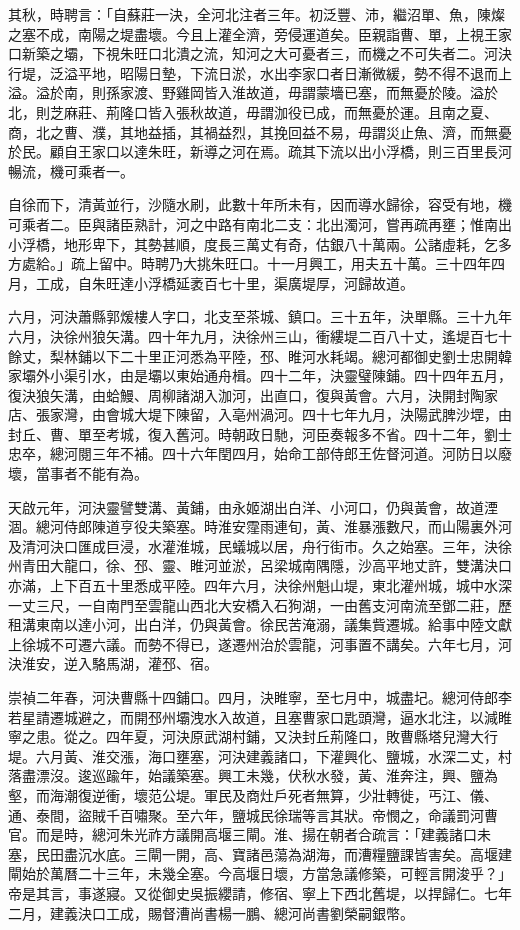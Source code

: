 其秋，時聘言：「自蘇莊一決，全河北注者三年。初泛豐、沛，繼沼單、魚，陳燦之塞不成，南陽之堤盡壞。今且上灌全濟，旁侵運道矣。臣親詣曹、單，上視王家口新築之壩，下視朱旺口北潰之流，知河之大可憂者三，而機之不可失者二。河決行堤，泛溢平地，昭陽日墊，下流日淤，水出李家口者日漸微緩，勢不得不退而上溢。溢於南，則孫家渡、野雞岡皆入淮故道，毋謂蒙墻已塞，而無憂於陵。溢於北，則芝麻莊、荊隆口皆入張秋故道，毋謂泇役已成，而無憂於運。且南之夏、商，北之曹、濮，其地益插，其禍益烈，其挽回益不易，毋謂災止魚、濟，而無憂於民。顧自王家口以達朱旺，新導之河在焉。疏其下流以出小浮橋，則三百里長河暢流，機可乘者一。

自徐而下，清黃並行，沙隨水刷，此數十年所未有，因而導水歸徐，容受有地，機可乘者二。臣與諸臣熟計，河之中路有南北二支：北出濁河，嘗再疏再壅；惟南出小浮橋，地形卑下，其勢甚順，度長三萬丈有奇，估銀八十萬兩。公諸虛耗，乞多方處給。」疏上留中。時聘乃大挑朱旺口。十一月興工，用夫五十萬。三十四年四月，工成，自朱旺達小浮橋延袤百七十里，渠廣堤厚，河歸故道。

六月，河決蕭縣郭煖樓人字口，北支至茶城、鎮口。三十五年，決單縣。三十九年六月，決徐州狼矢溝。四十年九月，決徐州三山，衝縷堤二百八十丈，遙堤百七十餘丈，梨林鋪以下二十里正河悉為平陸，邳、睢河水耗竭。總河都御史劉士忠開韓家壩外小渠引水，由是壩以東始通舟楫。四十二年，決靈璧陳鋪。四十四年五月，復決狼矢溝，由蛤鰻、周柳諸湖入泇河，出直口，復與黃會。六月，決開封陶家店、張家灣，由會城大堤下陳留，入亳州渦河。四十七年九月，決陽武脾沙堽，由封丘、曹、單至考城，復入舊河。時朝政日馳，河臣奏報多不省。四十二年，劉士忠卒，總河閱三年不補。四十六年閏四月，始命工部侍郎王佐督河道。河防日以廢壞，當事者不能有為。

天啟元年，河決靈譬雙溝、黃鋪，由永姬湖出白洋、小河口，仍與黃會，故道湮涸。總河侍郎陳道亨役夫築塞。時淮安霪雨連旬，黃、淮暴漲數尺，而山陽裏外河及清河決口匯成巨浸，水灌淮城，民蟻城以居，舟行街市。久之始塞。三年，決徐州青田大龍口，徐、邳、靈、睢河並淤，呂梁城南隅隱，沙高平地丈許，雙溝決口亦滿，上下百五十里悉成平陸。四年六月，決徐州魁山堤，東北灌州城，城中水深一丈三尺，一自南門至雲龍山西北大安橋入石狗湖，一由舊支河南流至鄧二莊，歷租溝東南以達小河，出白洋，仍與黃會。徐民苦淹溺，議集貲遷城。給事中陸文獻上徐城不可遷六議。而勢不得已，遂遷州治於雲龍，河事置不講矣。六年七月，河決淮安，逆入駱馬湖，灌邳、宿。

崇禎二年春，河決曹縣十四鋪口。四月，決睢寧，至七月中，城盡圮。總河侍郎李若星請遷城避之，而開邳州壩洩水入故道，且塞曹家口匙頭灣，逼水北注，以減睢寧之患。從之。四年夏，河決原武湖村鋪，又決封丘荊隆口，敗曹縣塔兒灣大行堤。六月黃、淮交漲，海口壅塞，河決建義諸口，下灌興化、鹽城，水深二丈，村落盡漂沒。逡巡踰年，始議築塞。興工未幾，伏秋水發，黃、淮奔注，興、鹽為壑，而海潮復逆衝，壞范公堤。軍民及商灶戶死者無算，少壯轉徙，丐江、儀、通、泰間，盜賊千百嘯聚。至六年，鹽城民徐瑞等言其狀。帝憫之，命議罰河曹官。而是時，總河朱光祚方議開高堰三閘。淮、揚在朝者合疏言：「建義諸口未塞，民田盡沉水底。三閘一開，高、寶諸邑蕩為湖海，而漕糧鹽課皆害矣。高堰建閘始於萬曆二十三年，未幾全塞。今高堰日壞，方當急議修築，可輕言開浚乎？」帝是其言，事遂寢。又從御史吳振纓請，修宿、寧上下西北舊堤，以捍歸仁。七年二月，建義決口工成，賜督漕尚書楊一鵬、總河尚書劉榮嗣銀幣。

